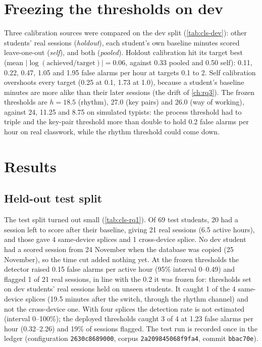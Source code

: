 \section{Freezing the thresholds on dev}
Three calibration sources were compared on the dev split (\cref{tab:cls-dev}): other
students' real sessions (\emph{holdout}), each student's own baseline minutes scored
leave-one-out (\emph{self}), and both (\emph{pooled}). Holdout calibration hit its target
best (mean $|\log(\text{achieved}/\text{target})| = 0.06$, against 0.33 pooled and 0.50 self):
0.11, 0.22, 0.47, 1.05 and 1.95 false alarms per hour at targets 0.1 to 2. Self calibration
overshoots every target (0.25 at 0.1, 1.73 at 1.0), because a student's baseline minutes
are more alike than their later sessions (the drift of \cref{ch:rq3}). The frozen
thresholds are $h = 18.5$ (rhythm), 27.0 (key pairs) and 26.0 (way of working), against 24,
11.25 and 8.75 on simulated typists: the process threshold had to triple and the key-pair
threshold more than double to hold 0.2 false alarms per hour on real classwork, while the
rhythm threshold could come down.



\section{Results}
\subsection{Held-out test split}
The test split turned out small (\cref{tab:cls-rq1}). Of 69 test students, 20 had a session
left to score after their baseline, giving 21 real sessions (6.5 active hours), and those
gave 4 same-device splices and 1 cross-device splice. No dev student had a scored session
from 24 November when the database was copied (25 November), so the time cut added nothing
yet. At the frozen thresholds the detector raised 0.15 false alarms per active hour (95\%
interval 0--0.49) and flagged 1 of 21 real sessions, in line with the 0.2 it was frozen for:
thresholds set on dev students' real sessions held on unseen students. It caught 1 of the 4
same-device splices (19.5 minutes after the switch, through the rhythm channel) and not the
cross-device one. With four splices the detection rate is not estimated (interval 0--100\%);
the deployed thresholds caught 3 of 4 at 1.23 false alarms per hour (0.32--2.26) and 19\% of
sessions flagged. The test run is recorded once in the ledger (configuration
\texttt{2630c8689000}, corpus \texttt{2a209845068f9fa4}, commit \texttt{bbac70e}).

